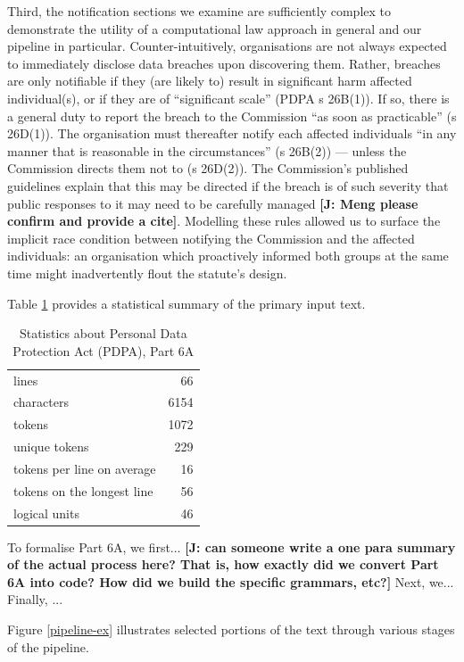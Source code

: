 \documentclass{IOS-Book-Article}
\newcommand{\todoj}[1]{{\color{red}\textbf{[J: #1]}}}
\begin{document}
Third, the notification sections we examine are sufficiently complex to demonstrate the utility of a computational law approach in general and our pipeline in particular. Counter-intuitively, organisations are not always expected to immediately disclose data breaches upon discovering them. Rather, breaches are only notifiable if they (are likely to) result in significant harm affected individual(s), or if they are of ``significant scale'' (PDPA s 26B(1)). If so, there is a general duty to report the breach to the Commission ``as soon as practicable'' (s 26D(1)). The organisation must thereafter notify each affected individuals ``in any manner that is reasonable in the circumstances'' (s 26B(2)) --- unless the Commission directs them not to (s 26D(2)). The Commission's published guidelines explain that this may be directed if the breach is of such severity that public responses to it may need to be carefully managed
 \todoj{ Meng please confirm and provide a cite}.
 Modelling these rules allowed us to surface the implicit race condition between notifying the Commission and the affected individuals: an organisation which proactively informed both groups at the same time might inadvertently flout the statute's design.

Table \ref{stats} provides a statistical summary of the primary input text.


\begin{table}
  \begin{tabular}{|l|r|}
\hline
lines & 66 \\
characters & 6154 \\
tokens & 1072 \\
unique tokens & 229 \\
tokens per line on average & 16 \\
tokens on the longest line & 56 \\
logical units & 46 \\
\hline
  \end{tabular}
  \caption{Statistics about Personal Data Protection Act (PDPA), Part 6A}
  \label{stats}
\end{table}

To formalise Part 6A, we first...
 \todoj{ can someone write a one para summary of the actual process here? That is, how exactly did we convert Part 6A into code? How did we build the specific grammars, etc?}
  Next, we... Finally, ...

Figure \ref{pipeline-ex} illustrates selected portions of the text through various stages of the pipeline.
\end{document}
